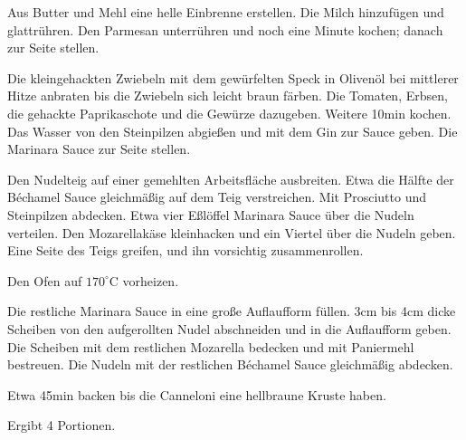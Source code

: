 \documentclass[11pt,twocolumn,a4paper]{article}
\begin{document}
Aus Butter und Mehl eine helle Einbrenne erstellen. Die Milch
hinzuf\"ugen und glattr\"uhren. Den Parmesan unterr\"uhren und noch
eine Minute kochen; danach zur Seite stellen.

Die kleingehackten Zwiebeln mit dem gew\"urfelten Speck in Oliven\"ol
bei mittlerer Hitze anbraten bis die Zwiebeln sich leicht braun
f\"arben. Die Tomaten, Erbsen, die gehackte Paprikaschote und die
Gew\"urze dazugeben. Weitere 10min kochen. Das Wasser von den
Steinpilzen abgie\ss en und mit dem Gin zur Sauce geben. Die Marinara
Sauce zur Seite stellen.

Den Nudelteig auf einer gemehlten Arbeitsfl\"ache ausbreiten. Etwa
die H\"alfte der B\'echamel Sauce gleichm\"a\ss ig auf dem Teig
verstreichen. Mit Prosciutto und Steinpilzen abdecken. Etwa vier
E\ss l\"offel Marinara Sauce \"uber die Nudeln verteilen. Den
Mozarellak\"ase kleinhacken und ein Viertel \"uber die Nudeln
geben. Eine Seite des Teigs greifen, und ihn vorsichtig
zusammenrollen.

Den Ofen auf $170^{\circ}$C vorheizen.

Die restliche Marinara Sauce in eine gro\ss e Auf\-lauf\-form
f\"ullen. 3cm bis 4cm dicke Scheiben von den aufgerollten Nudel
abschneiden und in die Auflaufform geben. Die Scheiben mit dem
restlichen Mozarella bedecken und mit Paniermehl bestreuen. Die Nudeln
mit der restlichen B\'echamel Sauce gleichm\"a\ss ig abdecken.

Etwa 45min backen bis die Canneloni eine hellbraune Kruste haben.

Ergibt 4 Portionen.
\end{document}
